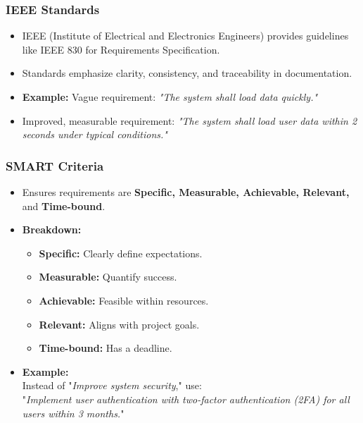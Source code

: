 \documentclass{beamer}
\begin{document}
\begin{frame}[fragile]
    \frametitle{IEEE Standards}
    \begin{itemize}
        \item IEEE (Institute of Electrical and Electronics Engineers) provides guidelines like IEEE 830 for Requirements Specification.
        \item Standards emphasize clarity, consistency, and traceability in documentation.
        \item \textbf{Example:} Vague requirement: \textit{"The system shall load data quickly."}
        \item Improved, measurable requirement: \textit{"The system shall load user data within 2 seconds under typical conditions."}
    \end{itemize}
\end{frame}

\begin{frame}[fragile]
    \frametitle{SMART Criteria}
    \begin{itemize}
        \item Ensures requirements are \textbf{Specific, Measurable, Achievable, Relevant,} and \textbf{Time-bound}.
        \item \textbf{Breakdown:} \\
        \begin{itemize}
            \item \textbf{Specific:} Clearly define expectations.
            \item \textbf{Measurable:} Quantify success.
            \item \textbf{Achievable:} Feasible within resources.
            \item \textbf{Relevant:} Aligns with project goals.
            \item \textbf{Time-bound:} Has a deadline.
        \end{itemize}
        \item \textbf{Example:} \\
        Instead of "\textit{Improve system security}," use: \\
        "\textit{Implement user authentication with two-factor authentication (2FA) for all users within 3 months.}"
    \end{itemize}
\end{frame}
\end{document}
